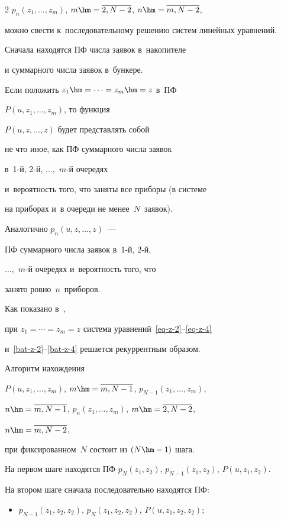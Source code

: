 \begin{multicols}{2}
$p_{n}(z_1,\ldots,z_{m})$, $m\hm=\overline{2,N-2}$, $n\hm=\overline{m,N-2}$,


можно свести к~последовательному решению систем линейных уравнений.





Сначала находятся ПФ числа заявок в~накопителе


и суммарного числа заявок в~бункере.


Если положить $z_1\hm=\cdots=z_m\hm=z$ в~ПФ


$P(u,z_1,\ldots,z_{m})$, то функция


$P(u,z,\ldots,z)$ будет представлять собой


не что иное, как ПФ суммарного числа заявок 


в~\mbox{1-й}, \mbox{2-й}, $\ldots,$ $m$-й очередях 


и~вероятность того, что заняты все приборы (в системе


на приборах и~в очереди не менее~$N$~заявок).


Аналогично $p_n(u,z,\ldots,z)$~---


ПФ суммарного числа заявок в~\mbox{1-й}, \mbox{2-й},\


$\ldots,$ $m$-й очередях и~вероятность того, что


занято ровно~$n$~приборов.


Как показано в~\cite{p1},


при $z_1=\cdots=z_m=z$ система уравнений~\eqref{eq-z-2}--\eqref{eq-z-4}


и~\eqref{bat-z-2}--\eqref{bat-z-4} решается рекуррентным образом.





Алгоритм нахождения


$P(u,z_1,\ldots,z_{m})$, $m\hm=\overline{m,N-1}$,  $p_{N-1}(z_1,\ldots,z_{m})$, 


$n\hm=\overline{m,N-1}$, $p_{n}(z_1,\ldots,z_{m})$, $m\hm=\overline{2,N-2}$, 


$n\hm=\overline{m,N-2}$,


при фиксированном~$N$ состоит из $(N\hm-1)$ шага.


На первом шаге находятся ПФ    $p_{N}(z_1,z_{2})$, $p_{N-1}(z_1,z_2)$, $P(u,z_1,z_2)$.


На втором шаге сначала последовательно находятся ПФ:


\begin{itemize}


\item $p_{N-1}(z_1,z_2,z_2)$,  $p_{N}(z_1,z_{2},z_2)$, $P(u,z_1,z_2,z_2)$;






\end{itemize}
\end{multicols}
